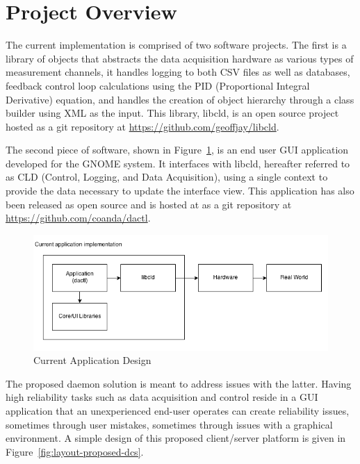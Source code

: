 \documentclass[11pt]{article}
\begin{document}
  \section{Project Overview}\label{sec:desc}

    The current implementation is comprised of two software projects. The first is a
    library of objects that abstracts the data acquisition hardware as various
    types of measurement channels, it handles logging to both CSV files as well
    as databases, feedback control loop calculations using the PID (Proportional
    Integral Derivative) equation, and handles the creation of object hierarchy
    through a class builder using XML as the input. This library, libcld, is an
    open source project hosted as a git repository at
    \url{https://github.com/geoffjay/libcld}.

    The second piece of software, shown in Figure~\ref{fig:layout-dactl}, is an
    end user GUI application developed for the GNOME system. It interfaces with
    libcld, hereafter referred to as CLD (Control, Logging, and Data
    Acquisition), using a single context to provide the data necessary to
    update the interface view. This application has also been released as open
    source and is hosted at as a git repository at
    \url{https://github.com/coanda/dactl}.

    \begin{figure}[H]
      \centering
      \includegraphics[scale=.6]{figures/dactl-current-layout.png}
      \caption{Current Application Design}\label{fig:layout-dactl}
    \end{figure}

    The proposed daemon solution is meant to address issues with the latter.
    Having high reliability tasks such as data acquisition and control reside in
    a GUI application that an unexperienced end-user operates can create reliability
    issues, sometimes through user mistakes, sometimes through issues with a
    graphical environment. A simple design of this proposed client/server
    platform is given in Figure~\ref{fig:layout-proposed-dcs}.
\end{document}
